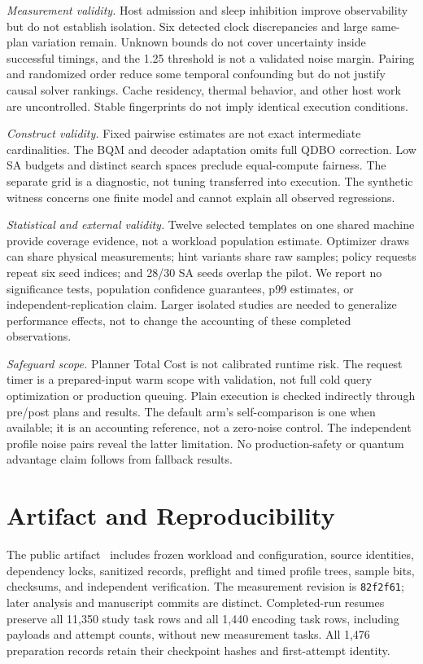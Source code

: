 \documentclass[conference]{IEEEtran}
\begin{document}
\emph{Measurement validity.} Host admission and sleep inhibition improve
observability but do not establish isolation. Six detected clock discrepancies
and large same-plan variation remain. Unknown bounds do not cover uncertainty
inside successful timings, and the 1.25 threshold is not a validated noise margin.
Pairing and randomized order reduce some temporal confounding but do not justify
causal solver rankings. Cache residency, thermal behavior, and other host work
are uncontrolled. Stable fingerprints do not imply identical execution conditions.

\emph{Construct validity.} Fixed pairwise estimates are not exact intermediate
cardinalities. The BQM and decoder adaptation omits full QDBO correction. Low SA
budgets and distinct search spaces preclude equal-compute fairness. The separate
grid is a diagnostic, not tuning transferred into execution. The synthetic
witness concerns one finite model and cannot explain all observed regressions.

\emph{Statistical and external validity.} Twelve selected templates on one
shared machine provide coverage evidence, not a workload population estimate.
Optimizer draws can share physical measurements; hint variants share raw samples;
policy requests repeat six seed indices; and 28/30 SA seeds overlap the pilot.
We report no significance tests, population confidence guarantees, p99 estimates,
or independent-replication claim. Larger isolated studies are needed to generalize
performance effects, not to change the accounting of these completed observations.

\emph{Safeguard scope.} Planner Total Cost is not calibrated runtime risk.
The request timer is a prepared-input warm scope with validation, not full cold
query optimization or production queuing. Plain execution is checked indirectly
through pre/post plans and results. The default arm's self-comparison is one
when available; it is an accounting reference, not a zero-noise control. The
independent profile noise pairs reveal the latter limitation. No production-safety
or quantum advantage claim follows from fallback results.

\section{Artifact and Reproducibility}
The public artifact~\cite{humagain2026artifact} includes frozen workload and
configuration, source identities, dependency locks, sanitized records, preflight
and timed profile trees, sample bits, checksums, and independent verification.
The measurement revision is \texttt{82f2f61}; later analysis and manuscript commits
are distinct. Completed-run resumes preserve all 11,350 study task rows and all
1,440 encoding task rows, including payloads and attempt counts, without new
measurement tasks. All 1,476 preparation records retain their checkpoint hashes
and first-attempt identity.
\end{document}
